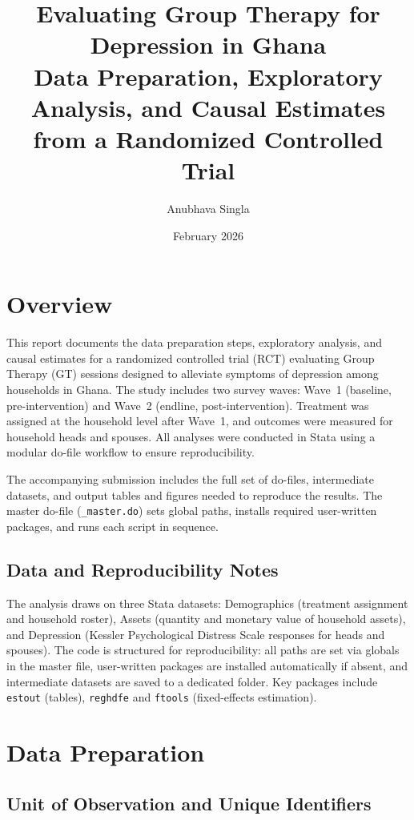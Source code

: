 \documentclass[12pt]{article}
\title{%
  \textbf{Evaluating Group Therapy for Depression in Ghana}\\[6pt]
  \large Data Preparation, Exploratory Analysis, and Causal Estimates from a Randomized Controlled Trial
}
\author{Anubhava Singla}
\date{February 2026}
\begin{document}
\maketitle

\section*{Overview}

This report documents the data preparation steps, exploratory analysis, and causal estimates for a randomized controlled trial (RCT) evaluating Group Therapy (GT) sessions designed to alleviate symptoms of depression among households in Ghana. The study includes two survey waves: Wave~1 (baseline, pre-intervention) and Wave~2 (endline, post-intervention). Treatment was assigned at the household level after Wave~1, and outcomes were measured for household heads and spouses. All analyses were conducted in Stata using a modular do-file workflow to ensure reproducibility.

The accompanying submission includes the full set of do-files, intermediate datasets, and output tables and figures needed to reproduce the results. The master do-file (\texttt{\_master.do}) sets global paths, installs required user-written packages, and runs each script in sequence.

\subsection*{Data and Reproducibility Notes}

The analysis draws on three Stata datasets: Demographics (treatment assignment and household roster), Assets (quantity and monetary value of household assets), and Depression (Kessler Psychological Distress Scale responses for heads and spouses). The code is structured for reproducibility: all paths are set via globals in the master file, user-written packages are installed automatically if absent, and intermediate datasets are saved to a dedicated folder. Key packages include \texttt{estout} (tables), \texttt{reghdfe} and \texttt{ftools} (fixed-effects estimation).


\section{Data Preparation}

\subsection{Unit of Observation and Unique Identifiers}
\end{document}

